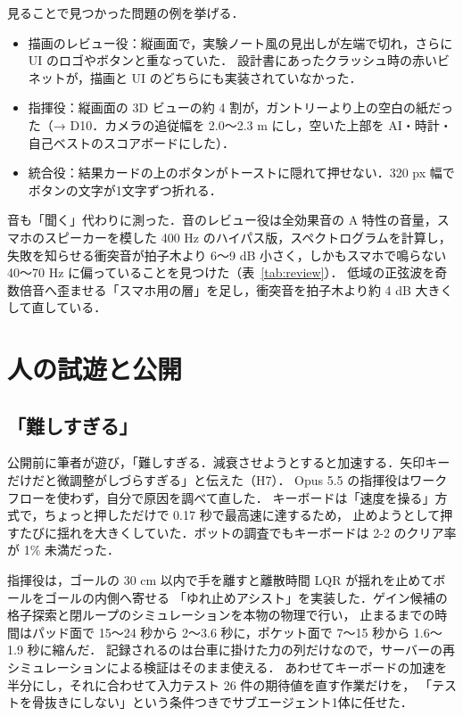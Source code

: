 \documentclass[a4paper,10pt]{ltjsarticle}
\newcommand{\tabref}[1]{表~\ref{#1}}
\begin{document}
見ることで見つかった問題の例を挙げる．
\begin{itemize}
  \item 描画のレビュー役：縦画面で，実験ノート風の見出しが左端で切れ，さらに UI のロゴやボタンと重なっていた．
  設計書にあったクラッシュ時の赤いビネットが，描画と UI のどちらにも実装されていなかった．
  \item 指揮役：縦画面の 3D ビューの約 4 割が，ガントリーより上の空白の紙だった（→ D10．カメラの追従幅を 2.0〜2.3 m にし，空いた上部を AI・時計・自己ベストのスコアボードにした）．
  \item 統合役：結果カードの上のボタンがトーストに隠れて押せない．320 px 幅でボタンの文字が1文字ずつ折れる．
\end{itemize}

音も「聞く」代わりに測った．音のレビュー役は全効果音の A 特性の音量，スマホのスピーカーを模した 400 Hz のハイパス版，スペクトログラムを計算し，
失敗を知らせる衝突音が拍子木より 6〜9 dB 小さく，しかもスマホで鳴らない 40〜70 Hz に偏っていることを見つけた（\tabref{tab:review}）．
低域の正弦波を奇数倍音へ歪ませる「スマホ用の層」を足し，衝突音を拍子木より約 4 dB 大きくして直している．

\section{人の試遊と公開}
\label{sec:human}

\subsection{「難しすぎる」}

公開前に筆者が遊び，「難しすぎる．減衰させようとすると加速する．矢印キーだけだと微調整がしづらすぎる」と伝えた（H7）．
Opus 5.5 の指揮役はワークフローを使わず，自分で原因を調べて直した．
キーボードは「速度を操る」方式で，ちょっと押しただけで 0.17 秒で最高速に達するため，
止めようとして押すたびに揺れを大きくしていた．ボットの調査でもキーボードは 2-2 のクリア率が 1\% 未満だった．

指揮役は，ゴールの 30 cm 以内で手を離すと離散時間 LQR が揺れを止めてボールをゴールの内側へ寄せる
「ゆれ止めアシスト」を実装した．ゲイン候補の格子探索と閉ループのシミュレーションを本物の物理で行い，
止まるまでの時間はパッド面で 15〜24 秒から 2〜3.6 秒に，ポケット面で 7〜15 秒から 1.6〜1.9 秒に縮んだ．
記録されるのは台車に掛けた力の列だけなので，サーバーの再シミュレーションによる検証はそのまま使える．
あわせてキーボードの加速を半分にし，それに合わせて入力テスト 26 件の期待値を直す作業だけを，
「テストを骨抜きにしない」という条件つきでサブエージェント1体に任せた．
\end{document}
